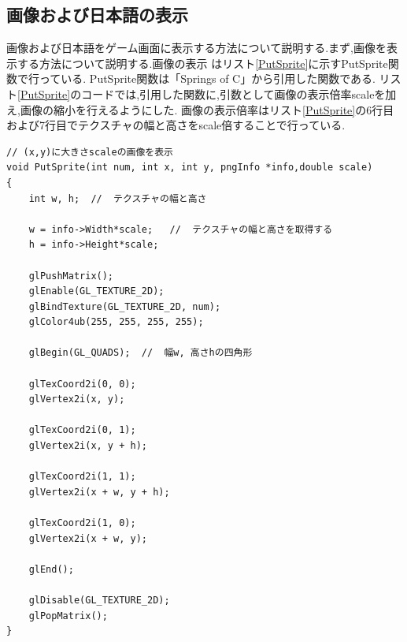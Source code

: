 \documentclass[a4j]{jarticle}
\begin{document}
  \subsection{画像および日本語の表示}  
  画像および日本語をゲーム画面に表示する方法について説明する.まず,画像を表示する方法について説明する.画像の表示
  はリスト\ref{PutSprite}に示すPutSprite関数で行っている. PutSprite関数は「Springs of C」\cite{springc}から引用した関数である.
  リスト\ref{PutSprite}のコードでは,引用した関数に,引数として画像の表示倍率scaleを加え,画像の縮小を行えるようにした.
  画像の表示倍率はリスト\ref{PutSprite}の6行目および7行目でテクスチャの幅と高さをscale倍することで行っている.
  \begin{lstlisting}[basicstyle=\ttfamily\footnotesize, frame=single,label=PutSprite,caption=PutSprite関数]
// (x,y)に大きさscaleの画像を表示
void PutSprite(int num, int x, int y, pngInfo *info,double scale)
{
    int w, h;  //  テクスチャの幅と高さ

    w = info->Width*scale;   //  テクスチャの幅と高さを取得する
    h = info->Height*scale;

    glPushMatrix();
    glEnable(GL_TEXTURE_2D);
    glBindTexture(GL_TEXTURE_2D, num);
    glColor4ub(255, 255, 255, 255);

    glBegin(GL_QUADS);  //  幅w, 高さhの四角形

    glTexCoord2i(0, 0); 
    glVertex2i(x, y);

    glTexCoord2i(0, 1);
    glVertex2i(x, y + h);

    glTexCoord2i(1, 1);
    glVertex2i(x + w, y + h);

    glTexCoord2i(1, 0);
    glVertex2i(x + w, y);

    glEnd();

    glDisable(GL_TEXTURE_2D);
    glPopMatrix();
}
          \end{lstlisting} 
\end{document}
